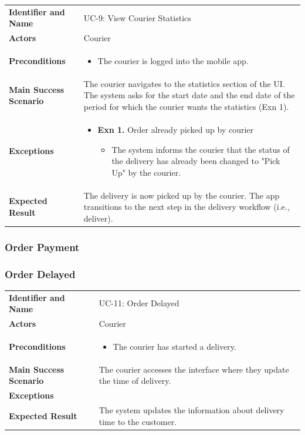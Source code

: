 \noindent
\begin{tabularx}{\textwidth}{l X}
    \textbf{Identifier and Name} & UC-9: View Courier Statistics \\
    \textbf{Actors} & Courier \\
    \textbf{Preconditions} & 
    \begin{itemize} 
        \item The courier is logged into the mobile app.
    \end{itemize} \\
    \textbf{Main Success Scenario} & The courier navigates to the statistics section of the UI. The system asks for the start date and the end date of the period for which the courier wants the statistics (Exn 1). \\
    \textbf{Exceptions} & 
    \begin{itemize} 
        \item \textbf{Exn 1.} Order already picked up by courier
        \begin{itemize}
            \item The system informs the courier that the status of the delivery has already been changed to "Pick Up" by the courier.
        \end{itemize}
    \end{itemize} \\
    \textbf{Expected Result} & The delivery is now picked up by the courier. The app transitions to the next step in the delivery workflow (i.e., deliver).
\end{tabularx}

\subsubsection{Order Payment}

\noindent

\subsubsection{Order Delayed}

\noindent
\begin{tabularx}{\textwidth}{l X}
    \textbf{Identifier and Name} & UC-11: Order Delayed \\
    \textbf{Actors} & Courier \\
    \textbf{Preconditions} & 
    \begin{itemize} 
        \item The courier has started a delivery.
    \end{itemize} \\
    \textbf{Main Success Scenario} & The courier accesses the interface where they update the time of delivery. \\
    \textbf{Exceptions} & \\
    \textbf{Expected Result} & The system updates the information about delivery time to the customer.
\end{tabularx}

